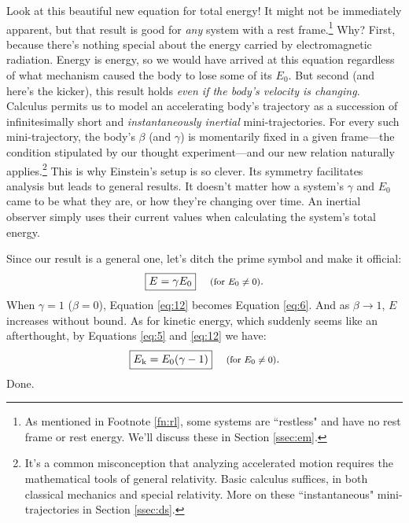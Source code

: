 \documentclass[12pt]{article}
\begin{document}
Look at this beautiful new equation for total energy! It might not be immediately apparent, but that result is good for \emph{any} system with a rest frame.\footnote{As mentioned in Footnote \ref{fn:rl}, some systems are ``restless" and have no rest frame or rest energy. We'll discuss these in Section \ref{ssec:em}.} Why? First, because there's nothing special about the energy carried by electromagnetic radiation. Energy is energy, so we would have arrived at this equation regardless of what mechanism caused the body to lose some of its $E_0$. But second (and here's the kicker), this result holds \emph{even if the body's velocity is changing}. Calculus permits us to model an accelerating body's trajectory as a succession of infinitesimally short and \emph{instantaneously inertial} mini-trajectories. For every such mini-trajectory, the body's $\beta$ (and $\gamma$) is momentarily fixed in a given frame---the condition stipulated by our thought experiment---and our new relation naturally applies.\footnote{It's a common misconception that analyzing accelerated motion requires the mathematical tools of general relativity. Basic calculus suffices, in both classical mechanics and special relativity. More on these ``instantaneous" mini-trajectories in Section \ref{ssec:ds}.} This is why Einstein's setup is so clever. Its symmetry facilitates analysis but leads to general results. It doesn't matter how a system's $\gamma$ and $E_0$ came to be what they are, or how they're changing over time. An inertial observer simply uses their current values when calculating the system's total energy.

Since our result is a general one, let's ditch the prime symbol and make it official:
\begin{equation}\label{eq:12}
\boxed{E = \gamma E_0} \quad \textrm{\footnotesize{ (for $E_0 \neq 0$)}}.
\end{equation}
When $\gamma=1$ ($\beta=0$), Equation \ref{eq:12} becomes Equation \ref{eq:6}. And as $\beta \rightarrow 1$, $E$ increases without bound. As for kinetic energy, which suddenly seems like an afterthought, by Equations \ref{eq:5} and \ref{eq:12} we have:
\begin{equation}\label{eq:13}
\boxed{E_{\mkern.5mu \textrm{k}} = E_0 (\gamma - 1)} \quad \textrm{\footnotesize{ (for $E_0 \neq 0$)}}.
\end{equation}
Done.
\end{document}
